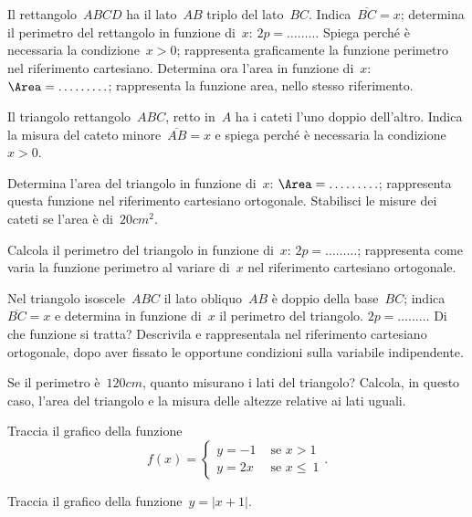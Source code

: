 \begin{esercizio}
\label{ese:D.58}
Il rettangolo~${ABCD}$ ha il lato~${AB}$ triplo del lato~${BC}$. Indica~$\overline{BC}=x$; determina il perimetro del
rettangolo in funzione di~$x$: $2p=\ldots \ldots \ldots$
Spiega perché è necessaria la condizione~$x>0$; rappresenta graficamente la funzione perimetro nel riferimento cartesiano.
Determina ora l'area in funzione di~$x$: $\Area=\ldots \ldots \ldots$; rappresenta la funzione area, nello stesso riferimento.
\end{esercizio}

\begin{esercizio}
\label{ese:D.59}
Il triangolo rettangolo~${ABC}$, retto in~$A$ ha i cateti l'uno doppio dell'altro. Indica la misura del cateto minore~$\overline{AB}=x$
e spiega perché è necessaria la condizione~$x>0$.

Determina l'area del triangolo in funzione di~$x$: $\Area=\ldots \ldots \ldots$;
rappresenta questa funzione nel riferimento cartesiano ortogonale.
Stabilisci le misure dei cateti se l'area è di~$20\unit{cm^2}$.

Calcola il perimetro del triangolo in funzione di~$x$: $2p=\ldots \ldots \ldots$; rappresenta come varia la funzione perimetro al variare di~$x$ nel riferimento cartesiano ortogonale.
\end{esercizio}

\begin{esercizio}
\label{ese:D.60}
Nel triangolo isoscele~${ABC}$ il lato obliquo~${AB}$ è doppio della base~${BC}$; indica~$\overline{BC}=x$ e determina in funzione
di~$x$ il perimetro del triangolo. $2p=\ldots \ldots \ldots$
Di che funzione si tratta? Descrivila e rappresentala nel riferimento cartesiano ortogonale, dopo aver fissato le opportune condizioni
sulla variabile indipendente.

Se il perimetro è~$120\unit{cm}$, quanto misurano i lati del triangolo?
Calcola, in questo caso, l'area del triangolo e la misura delle altezze relative ai lati uguali.
\end{esercizio}

\begin{esercizio}
\label{ese:D.61}
Traccia il grafico della funzione
\[f(x)=
\begin{cases}
y=-1 & \text{ se } x>1\\
y=2x & \text{ se } x \le~1
\end{cases}
.\]
\end{esercizio}

\begin{esercizio}
\label{ese:D.62}
Traccia il grafico della funzione~$y=|{x+1}|$.
\end{esercizio}


